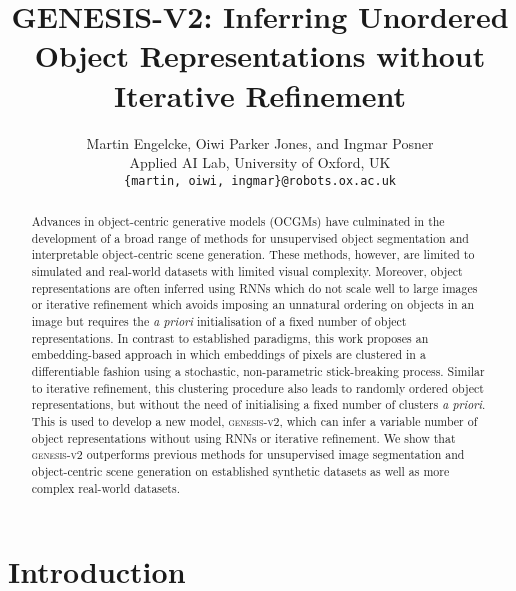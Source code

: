 \documentclass{article}
\title{GENESIS-V2: Inferring Unordered Object Representations without Iterative Refinement}
\author{Martin Engelcke, Oiwi Parker Jones, and Ingmar Posner\\
  Applied AI Lab, University of Oxford, UK\\
  \texttt{\{martin, oiwi, ingmar\}@robots.ox.ac.uk} \\
}
\begin{document}
\maketitle


\begin{abstract}
Advances in object-centric generative models (OCGMs) have culminated in the development of a broad range of methods for unsupervised object segmentation and interpretable object-centric scene generation.
These methods, however, are limited to simulated and real-world datasets with limited visual complexity.
Moreover, object representations are often inferred using RNNs which do not scale well to large images or iterative refinement which avoids imposing an unnatural ordering on objects in an image but requires the \emph{a priori} initialisation of a fixed number of object representations.
In contrast to established paradigms, this work proposes an embedding-based approach in which embeddings of pixels are clustered in a differentiable fashion using a stochastic, non-parametric stick-breaking process.
Similar to iterative refinement, this clustering procedure also leads to randomly ordered object representations, but without the need of initialising a fixed number of clusters \emph{a priori}.
This is used to develop a new model, \textsc{genesis-v2}, which can infer a variable number of object representations without using RNNs or iterative refinement.
We show that \textsc{genesis-v2} outperforms previous methods for unsupervised image segmentation and object-centric scene generation on established synthetic datasets as well as more complex real-world datasets.
\end{abstract}

\section{Introduction}
\end{document}
